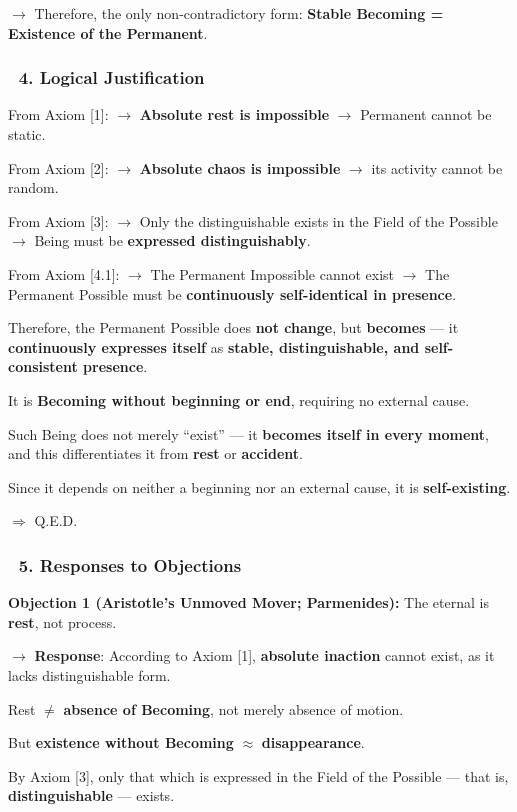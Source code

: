 \documentclass[12pt]{article}
\begin{document}
$\rightarrow$ Therefore, the only non-contradictory form: \textbf{Stable Becoming = Existence of the Permanent}.

\subsubsection*{🔹 4. Logical Justification}
From Axiom [1]:  
$\rightarrow$ \textbf{Absolute rest is impossible} $\rightarrow$ Permanent cannot be static.

From Axiom [2]:  
$\rightarrow$ \textbf{Absolute chaos is impossible} $\rightarrow$ its activity cannot be random.

From Axiom [3]:  
$\rightarrow$ Only the distinguishable exists in the Field of the Possible $\rightarrow$ Being must be \textbf{expressed distinguishably}.

From Axiom [4.1]:  
$\rightarrow$ The Permanent Impossible cannot exist $\rightarrow$ The Permanent Possible must be \textbf{continuously self-identical in presence}.

\bigskip
Therefore, the Permanent Possible does \textbf{not change}, but \textbf{becomes} — it \textbf{continuously expresses itself} as \textbf{stable, distinguishable, and self-consistent presence}.

It is \textbf{Becoming without beginning or end}, requiring no external cause.

Such Being does not merely ``exist'' — it \textbf{becomes itself in every moment}, and this differentiates it from \textbf{rest} or \textbf{accident}.

\bigskip
Since it depends on neither a beginning nor an external cause, it is \textbf{self-existing}.

$\Rightarrow$ Q.E.D.

\subsubsection*{🔹 5. Responses to Objections}
\textbf{Objection 1 (Aristotle’s Unmoved Mover; Parmenides):}  
The eternal is \textbf{rest}, not process.

$\rightarrow$ \textbf{Response}:  
According to Axiom [1], \textbf{absolute inaction} cannot exist, as it lacks distinguishable form.

Rest $\neq$ \textbf{absence of Becoming}, not merely absence of motion.

But \textbf{existence without Becoming} $\approx$ \textbf{disappearance}.

By Axiom [3], only that which is expressed in the Field of the Possible — that is, \textbf{distinguishable} — exists.
\end{document}
